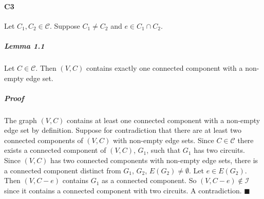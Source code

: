 \documentclass[letterpaper,12pt,oneside,onecolumn]{report}
\begin{document}
\paragraph{C3}
Let $C_1, C_2 \in \mathcal{C}$. Suppose $C_1 \neq C_2$ and $e \in C_1 \cap C_2$.
\subparagraph{Lemma 1.1}
Let $C \in \mathcal{C}$. Then $(V,C)$ contains exactly one connected component with a non-empty edge set.
\subparagraph{Proof}
The graph $(V,C)$ contains at least one connected component with a non-empty edge set by definition. Suppose for contradiction that there are at least two connected components of $(V,C)$ with non-empty edge sets.  Since $C \in \mathcal{C}$ there exists a connected component of $(V,C)$, $G_1$, such that $G_1$ has two circuits. Since $(V,C)$ has two connected components with non-empty edge sets, there is a connected component distinct from $G_1$, $G_2$, $E(G_2) \neq \emptyset$. Let $e \in E(G_2)$. Then $(V, C-e)$ contains $G_1$ as a connected component. So $(V, C-e) \not\in \mathcal{I}$ since it contains a connected component with two circuits. A contradiction. $\blacksquare$
\paragraph{}
\end{document}
